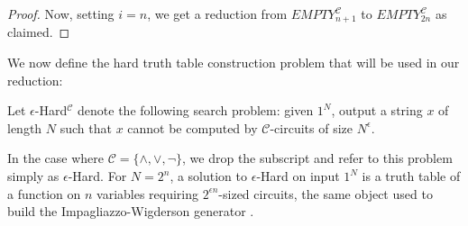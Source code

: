 \begin{proof}
Now, setting $i = n$, we get a reduction from {\sc $EMPTY_{n+1}^{\mathcal{C}}$} to {\sc $EMPTY_{2n}^{\mathcal{C}}$} as claimed.

\end{proof}
We now define the hard truth table construction problem that will be used in our reduction:
\begin{definition}
Let {\sc $\epsilon$-Hard}$^{\mathcal{C}}$ denote the following search problem: given $1^N$, output a string $x$ of length $N$ such that $x$ cannot be computed by $\mathcal{C}$-circuits of size $N^\epsilon$.
\end{definition}
In the case where $\mathcal{C} =\{\land,\lor,\lnot\}$, we drop the subscript and refer to this problem simply as {\sc $\epsilon$-Hard}.
For $N = 2^n$, a solution to {\sc $\epsilon$-Hard} on input $1^N$ is a truth table of a function on $n$ variables requiring $2^{\epsilon n}$-sized circuits, the same object used to build the Impagliazzo-Wigderson generator \cite{IW}.

